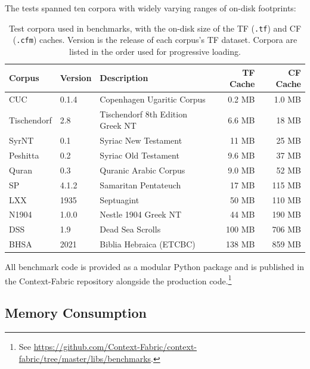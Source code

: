 \documentclass[11pt,a4paper]{article}
\begin{document}
\noindent The tests spanned ten corpora with widely varying ranges of on-disk footprints:

\begin{table}[htbp]
\centering
\caption{Test corpora used in benchmarks, with the on-disk size of the TF (\texttt{.tf}) and CF (\texttt{.cfm}) caches. Version is the release of each corpus's TF dataset. Corpora are listed in the order used for progressive loading.}
\label{tab:test_corpora}
\begin{tabular}{lllrr}
\toprule
\textbf{Corpus} & \textbf{Version} & \textbf{Description} & \textbf{TF Cache} & \textbf{CF Cache} \\
\midrule
CUC \cite{cuc} & 0.1.4 & Copenhagen Ugaritic Corpus & 0.2 MB & 1.0 MB \\
Tischendorf \cite{tischendorf} & 2.8 & Tischendorf 8th Edition Greek NT & 6.6 MB & 18 MB \\
SyrNT \cite{syrnt} & 0.1 & Syriac New Testament & 11 MB & 25 MB \\
Peshitta \cite{peshitta} & 0.2 & Syriac Old Testament & 9.6 MB & 37 MB \\
Quran \cite{quran} & 0.3 & Quranic Arabic Corpus & 9.0 MB & 52 MB \\
SP \cite{sp} & 4.1.2 & Samaritan Pentateuch & 17 MB & 115 MB \\
LXX \cite{lxx} & 1935 & Septuagint & 50 MB & 110 MB \\
N1904 \cite{n1904} & 1.0.0 & Nestle 1904 Greek NT & 44 MB & 190 MB \\
DSS \cite{dss} & 1.9 & Dead Sea Scrolls & 100 MB & 706 MB \\
BHSA \cite{bhsa} & 2021 & Biblia Hebraica (ETCBC) & 138 MB & 859 MB \\
\bottomrule
\end{tabular}
\end{table}

\noindent All benchmark code is provided as a modular Python package and is published
in the Context-Fabric repository alongside the production code.\footnote{
    See \url{https://github.com/Context-Fabric/context-fabric/tree/master/libs/benchmarks}.
}

\subsection{Memory Consumption}
\end{document}
